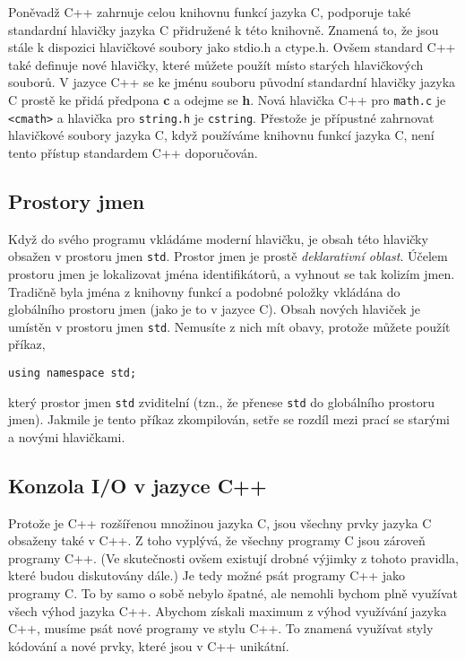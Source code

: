       Poněvadž C++ zahrnuje celou knihovnu funkcí jazyka C, podporuje také standardní hlavičky
      jazyka C přidružené k této knihovně. Znamená to, že jsou stále k dispozici hlavičkové soubory
      jako stdio.h a ctype.h. Ovšem standard C++ také definuje nové hlavičky, které můžete použít
      místo starých hlavičkových souborů. V jazyce C++ se ke jménu souboru původní standardní
      hlavičky jazyka C prostě ke přidá předpona \textbf{c} a odejme se \textbf{h}. Nová hlavička
      C++ pro \lstinline[style=luaCPPText]!math.c! je \lstinline[style=luaCPPText]!<cmath>! a
      hlavička pro \lstinline[style=luaCPPText]!string.h! je \lstinline[style=luaCPPText]!cstring!.
      Přestože je přípustné zahrnovat hlavičkové soubory jazyka C, když používáme knihovnu funkcí
      jazyka C, není tento přístup standardem C++ doporučován. 
      
    \subsection{Prostory jmen}
      Když do svého programu vkládáme moderní hlavičku, je obsah této hlavičky obsažen v prostoru
      jmen \lstinline[style=luaCPPText]!std!. Prostor jmen je prostě \emph{deklarativní oblast}.
      Účelem prostoru jmen je lokalizovat jména identifikátorů, a vyhnout se tak kolizím jmen.
      Tradičně byla jména z knihovny funkcí a podobné položky vkládána do globálního prostoru jmen
      (jako je to v jazyce C). Obsah nových hlaviček je umístěn v prostoru jmen
      \lstinline[style=luaCPPText]!std!. Nemusíte z nich mít obavy, protože můžete použít příkaz,
      \begin{lstlisting}[style=luaCPPStyle]
        using namespace std;
      \end{lstlisting}
      který prostor jmen \lstinline[style=luaCPPText]!std! zviditelní (tzn., že přenese
      \lstinline[style=luaCPPText]!std! do globálního prostoru jmen). Jakmile je tento příkaz
      zkompilován, setře se rozdíl mezi prací se starými a novými hlavičkami.
    
    \subsection{Konzola I/O v jazyce C++}
      Protože je C++ rozšířenou množinou jazyka C, jsou všechny prvky jazyka C obsaženy také v C++.
      Z toho vyplývá, že všechny programy C jsou zároveň programy C++. (Ve skutečnosti ovšem
      existují drobné výjimky z tohoto pravidla, které budou diskutovány dále.) Je tedy
      možné psát programy C++ jako programy C. To by samo o sobě nebylo špatné, ale nemohli bychom
      plně využívat všech výhod jazyka C++. Abychom získali maximum z výhod využívání jazyka C++,
      musíme psát nové programy ve stylu C++. To znamená využívat styly kódování a nové prvky, které
      jsou v C++ unikátní.

